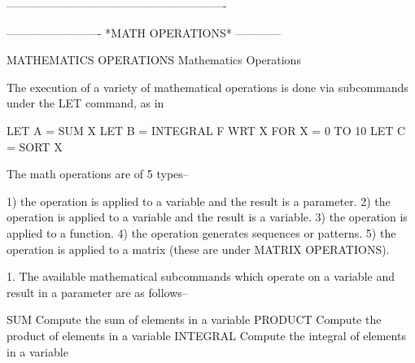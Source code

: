 ----------------------------------------------------------































































-------------------------  *MATH OPERATIONS*  ------------
 
MATHEMATICS OPERATIONS
Mathematics Operations
 
The execution of a variety of mathematical operations is done via
subcommands under the LET command, as in
 
   LET A = SUM X
   LET B = INTEGRAL F WRT X FOR X = 0 TO 10
   LET C = SORT X
 
The math operations are of 5 types--
 
   1) the operation is applied to a variable and the result is a
      parameter.
   2) the operation is applied to a variable and the result is a
      variable.
   3) the operation is applied to a function.
   4) the operation generates sequences or patterns.
   5) the operation is applied to a matrix (these are under MATRIX
      OPERATIONS).
 
1. The available mathematical subcommands which operate on a variable
   and result in a parameter are as follows--
 
      SUM                    Compute the sum of elements in a variable
      PRODUCT                Compute the product of elements in a
                             variable
      INTEGRAL               Compute the integral of elements in a
                             variable
 
